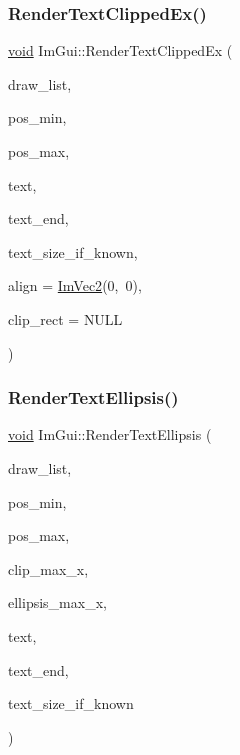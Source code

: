 \subsubsection{\texorpdfstring{Render\+Text\+Clipped\+Ex()}{RenderTextClippedEx()}}
{\footnotesize\ttfamily \hyperlink{imgui__impl__opengl3__loader_8h_ac668e7cffd9e2e9cfee428b9b2f34fa7}{void} Im\+Gui\+::\+Render\+Text\+Clipped\+Ex (\begin{DoxyParamCaption}\item[{\hyperlink{structImDrawList}{Im\+Draw\+List} $\ast$}]{draw\+\_\+list,  }\item[{const \hyperlink{structImVec2}{Im\+Vec2} \&}]{pos\+\_\+min,  }\item[{const \hyperlink{structImVec2}{Im\+Vec2} \&}]{pos\+\_\+max,  }\item[{const char $\ast$}]{text,  }\item[{const char $\ast$}]{text\+\_\+end,  }\item[{const \hyperlink{structImVec2}{Im\+Vec2} $\ast$}]{text\+\_\+size\+\_\+if\+\_\+known,  }\item[{const \hyperlink{structImVec2}{Im\+Vec2} \&}]{align = {\ttfamily \hyperlink{structImVec2}{Im\+Vec2}(0,~0)},  }\item[{const \hyperlink{structImRect}{Im\+Rect} $\ast$}]{clip\+\_\+rect = {\ttfamily NULL} }\end{DoxyParamCaption})}

\mbox{\label{namespaceImGui_a029bab9f4602be86178307b168975a6d}} 
\subsubsection{\texorpdfstring{Render\+Text\+Ellipsis()}{RenderTextEllipsis()}}
{\footnotesize\ttfamily \hyperlink{imgui__impl__opengl3__loader_8h_ac668e7cffd9e2e9cfee428b9b2f34fa7}{void} Im\+Gui\+::\+Render\+Text\+Ellipsis (\begin{DoxyParamCaption}\item[{\hyperlink{structImDrawList}{Im\+Draw\+List} $\ast$}]{draw\+\_\+list,  }\item[{const \hyperlink{structImVec2}{Im\+Vec2} \&}]{pos\+\_\+min,  }\item[{const \hyperlink{structImVec2}{Im\+Vec2} \&}]{pos\+\_\+max,  }\item[{float}]{clip\+\_\+max\+\_\+x,  }\item[{float}]{ellipsis\+\_\+max\+\_\+x,  }\item[{const char $\ast$}]{text,  }\item[{const char $\ast$}]{text\+\_\+end,  }\item[{const \hyperlink{structImVec2}{Im\+Vec2} $\ast$}]{text\+\_\+size\+\_\+if\+\_\+known }\end{DoxyParamCaption})}


